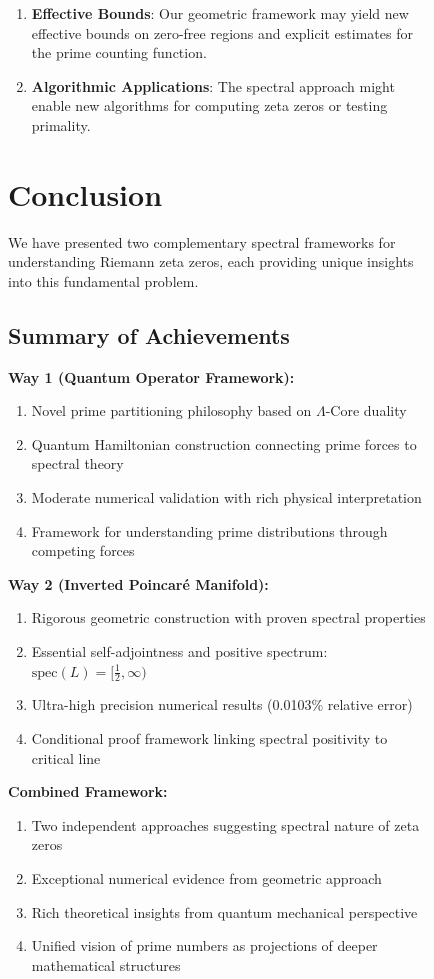 \documentclass[12pt]{article}
\begin{document}
\begin{figure}[ht]
\begin{enumerate}
\item \textbf{Effective Bounds}: Our geometric framework may yield new effective bounds on zero-free regions and explicit estimates for the prime counting function.

\item \textbf{Algorithmic Applications}: The spectral approach might enable new algorithms for computing zeta zeros or testing primality.
\end{enumerate}

\section{Conclusion}

We have presented two complementary spectral frameworks for understanding Riemann zeta zeros, each providing unique insights into this fundamental problem.

\subsection{Summary of Achievements}

\textbf{Way 1 (Quantum Operator Framework):}
\begin{enumerate}
\item Novel prime partitioning philosophy based on $\Lambda$-Core duality
\item Quantum Hamiltonian construction connecting prime forces to spectral theory
\item Moderate numerical validation with rich physical interpretation
\item Framework for understanding prime distributions through competing forces
\end{enumerate}

\textbf{Way 2 (Inverted Poincaré Manifold):}
\begin{enumerate}
\item Rigorous geometric construction with proven spectral properties
\item Essential self-adjointness and positive spectrum: $\text{spec}(L) = [\frac{1}{2}, \infty)$
\item Ultra-high precision numerical results (0.0103\% relative error)
\item Conditional proof framework linking spectral positivity to critical line
\end{enumerate}

\textbf{Combined Framework:}
\begin{enumerate}
\item Two independent approaches suggesting spectral nature of zeta zeros
\item Exceptional numerical evidence from geometric approach
\item Rich theoretical insights from quantum mechanical perspective
\item Unified vision of prime numbers as projections of deeper mathematical structures
\end{enumerate}


\end{figure}
\end{document}
